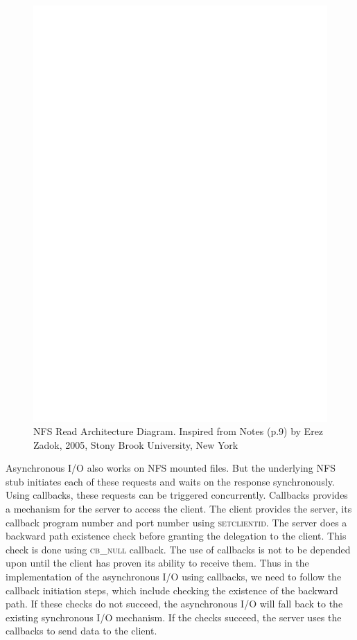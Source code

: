 \begin{figure}
\centering
\includegraphics[scale=0.7]{figures/Read.eps}
\caption{NFS Read Architecture Diagram. Inspired from Notes \cite{NFSv4}(p.9) by Erez Zadok, 2005, Stony Brook University, New York}
\label{fig:NFSReadArch}
\end{figure}


Asynchronous I/O also works on NFS mounted files. But the underlying NFS stub initiates each of these requests and waits on the response synchronously. Using callbacks, these requests can be triggered concurrently. Callbacks provides a mechanism for the server to access the client. The client provides the server, its callback program number and port number using \textsc{setclientid}. The server does a backward path existence check before granting the delegation to the client. This check is done using \textsc{cb\_null} callback. The use of callbacks is not to be depended upon until the client has proven its ability to receive them. Thus in the implementation of the asynchronous I/O using callbacks, we need to follow the callback initiation steps, which include checking the existence of the backward path. If these checks do not succeed, the asynchronous I/O will fall back to the existing synchronous I/O mechanism. If the checks succeed, the server uses the callbacks to send data to the client.

